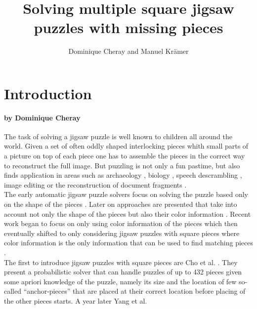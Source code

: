 \documentclass[]{report}
\title{Solving multiple square jigsaw puzzles with missing pieces}
\author{Dominique Cheray and Manuel Krämer}
\begin{document}
\maketitle

\begin{abstract}
\end{abstract}

\tableofcontents

\chapter{Introduction}
\subsubsection*{by Dominique Cheray}
The task of solving a jigsaw puzzle is well known to children all around the
world. Given a set of often oddly shaped interlocking pieces whith small parts
of a picture on top of each piece one has to assemble the pieces in the correct
way to reconstruct the full image. But puzzling is not only a fun pastime, but
also finds application in areas such as archaeology \cite{brown2008system,
  liu2011automated, koller2006computer}, biology \cite{marande2007mitochondrial}, speech
descrambling \cite{zhao2007puzzle}, image editing \cite{cho2008patch} or the
reconstruction of document fragments \cite{zhu2008globally}. \\
The early automatic jigsaw puzzle solvers focus on solving the puzzle based
only on the shape of the pieces \cite{freeman1964apictorial, wolfson1988solving,
webster1990computer, kong2001solving}. Later on approaches are presented that
take into account not only the shape of the pieces but also their color
information \cite{kosiba1994automatic, makridis2006new, sagiroglu2006texture}.
Recent work began to focus on only using color information of the pieces
\cite{nielsen2008solving} which then eventually shifted to only considering jigsaw
puzzles with square pieces where color information is the only information that
can be used to find matching pieces \cite{Cho2010, yang2011particle,
  Pomeranz2011, gallagher2012jigsaw, son2014solving, sholomon2013genetic,
  Paikin2015}. \\
The first to introduce jigsaw puzzles with square pieces are Cho et al.
\cite{Cho2010}. They present a probabilistic solver that can handle puzzles
of up to 432 pieces given some apriori knowledge of the puzzle, namely its size and the
location of few so-called ``anchor-pieces'' that are placed at their correct
location before placing of the other pieces starts. A year later Yang et al.
\end{document}
